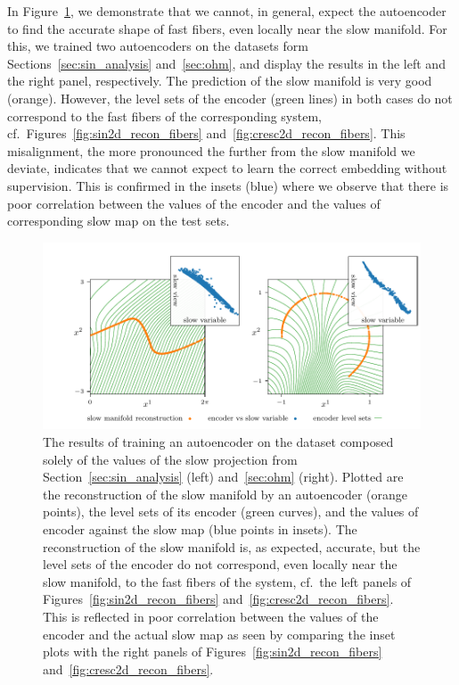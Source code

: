\documentclass{article}
\begin{document}
In Figure~\ref{fig:sin2d_cresc2d_auto}, we demonstrate that we cannot, in general, expect the autoencoder to find the accurate shape of fast fibers, even locally near the slow manifold. For this, we trained two autoencoders on the datasets form Sections~\ref{sec:sin_analysis} and~\ref{sec:ohm}, and display the results in the left and the right panel, respectively. The prediction of the slow manifold is very good (orange). However, the level sets of the encoder (green lines) in both cases do not correspond to the fast fibers of the corresponding system, cf.~Figures~\ref{fig:sin2d_recon_fibers} and~\ref{fig:cresc2d_recon_fibers}. This misalignment, the more pronounced the further from the slow manifold we deviate, indicates that we cannot expect to learn the correct embedding without supervision. This is confirmed in the insets (blue) where we observe that there is poor correlation between the values of the encoder and the values of corresponding slow map on the test sets.
\begin{figure}
    \centering
    \includegraphics[width=\textwidth]{figs/sin2d_cresc2d_auto.pdf}
    \caption{The results of training an autoencoder on the dataset composed solely of the values of the slow projection from Section~\ref{sec:sin_analysis} (left) and~\ref{sec:ohm} (right). Plotted are the reconstruction of the slow manifold by an autoencoder (orange points), the level sets of its encoder (green curves), and the values of encoder against the slow map (blue points in insets). The reconstruction of the slow manifold is, as expected, accurate, but the level sets of the encoder do not correspond, even locally near the slow manifold, to the fast fibers of the system, cf.~the left panels of Figures~\ref{fig:sin2d_recon_fibers} and~\ref{fig:cresc2d_recon_fibers}. This is reflected in poor correlation between the values of the encoder and the actual slow map as seen by comparing the inset plots with the right panels of Figures~\ref{fig:sin2d_recon_fibers} and~\ref{fig:cresc2d_recon_fibers}.}
    \label{fig:sin2d_cresc2d_auto}
\end{figure}
\end{document}
